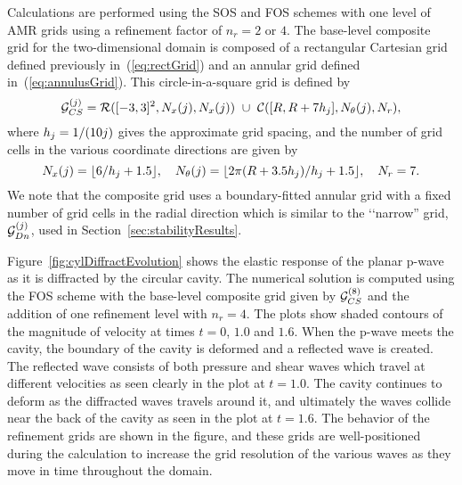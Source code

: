 Calculations are performed using the SOS and FOS schemes with one level of AMR grids
using a refinement factor of $n_r=2$ or $4$.  The base-level composite grid for the two-dimensional domain
is composed of a rectangular Cartesian grid defined previously in~(\ref{eq:rectGrid}) and an annular
grid defined in~(\ref{eq:annulusGrid}).  This circle-in-a-square grid is defined by
\[
  {\mathcal G}_{CS}^{(j)} = {\mathcal R}([-3,3]^2 ,N_{x}(j),N_{x}(j)) ~\cup~ {\mathcal C}([R,R+7h_{j}], N_{\theta}(j),N_{r}),
\]
where $h_{j}=1/(10 j)$ gives the approximate grid spacing, and the number of grid cells in the
various coordinate directions are given by
\[
N_{x}(j)=\lfloor 6/h_{j}+1.5\rfloor, \quad
N_{\theta}(j)=\lfloor 2\pi(R+3.5h_{j})/h_{j}+1.5\rfloor,\quad 
N_{r}=7.
\]
We note that the composite grid uses a boundary-fitted annular grid with a fixed number of grid
cells in the radial direction which is similar to the \lq\lq narrow'' grid, ${\mathcal G}_{Dn}^{(j)}$, used
in Section~\ref{sec:stabilityResults}.

Figure~\ref{fig:cylDiffractEvolution} shows the elastic response of the planar p-wave as it
is diffracted by the circular cavity.  The numerical solution is computed using the FOS scheme
with the base-level composite grid given by ${\mathcal G}_{CS}^{(8)}$ and the addition of one refinement level with $n_r=4$.  
The plots show shaded contours of the magnitude of velocity
at times $t=0$, $1.0$ and $1.6$.  When the p-wave meets the cavity, the boundary of the cavity is
deformed and a reflected wave is created.  The reflected wave consists of both pressure and shear waves
which travel at different velocities as seen clearly in the plot at $t=1.0$.  The cavity continues
to deform as the diffracted waves travels around it, and ultimately the waves collide near the
back of the cavity as seen in the plot at $t=1.6$.  The behavior of the refinement grids are shown
in the figure, and these grids are well-positioned during the calculation to increase the grid resolution
of the various waves as they move in time throughout the domain.





